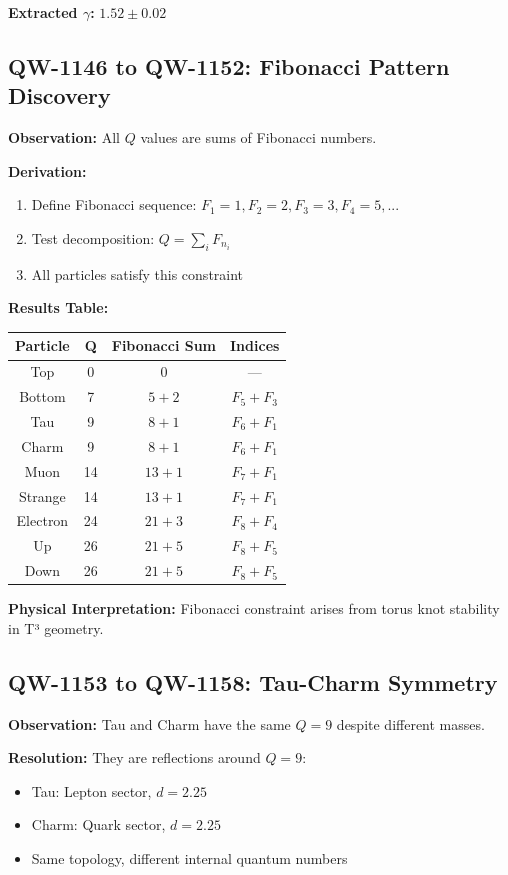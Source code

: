 \documentclass[11pt, a4paper]{article}
\theoremstyle{remark}
\begin{document}
\textbf{Extracted $\gamma$:} $1.52 \pm 0.02$

\subsection{QW-1146 to QW-1152: Fibonacci Pattern Discovery}

\textbf{Observation:} All $Q$ values are sums of Fibonacci numbers.

\textbf{Derivation:}
\begin{enumerate}
    \item Define Fibonacci sequence: $F_1 = 1, F_2 = 2, F_3 = 3, F_4 = 5, ...$
    \item Test decomposition: $Q = \sum_i F_{n_i}$
    \item All particles satisfy this constraint
\end{enumerate}

\textbf{Results Table:}
\begin{center}
\begin{tabular}{|c|c|c|c|}
\hline
\textbf{Particle} & \textbf{Q} & \textbf{Fibonacci Sum} & \textbf{Indices} \\
\hline
Top & 0 & 0 & --- \\
Bottom & 7 & $5 + 2$ & $F_5 + F_3$ \\
Tau & 9 & $8 + 1$ & $F_6 + F_1$ \\
Charm & 9 & $8 + 1$ & $F_6 + F_1$ \\
Muon & 14 & $13 + 1$ & $F_7 + F_1$ \\
Strange & 14 & $13 + 1$ & $F_7 + F_1$ \\
Electron & 24 & $21 + 3$ & $F_8 + F_4$ \\
Up & 26 & $21 + 5$ & $F_8 + F_5$ \\
Down & 26 & $21 + 5$ & $F_8 + F_5$ \\
\hline
\end{tabular}
\end{center}

\textbf{Physical Interpretation:} Fibonacci constraint arises from torus knot stability in T³ geometry.

\subsection{QW-1153 to QW-1158: Tau-Charm Symmetry}

\textbf{Observation:} Tau and Charm have the same $Q = 9$ despite different masses.

\textbf{Resolution:} They are reflections around $Q = 9$:
\begin{itemize}
    \item Tau: Lepton sector, $d = 2.25$
    \item Charm: Quark sector, $d = 2.25$
    \item Same topology, different internal quantum numbers
\end{itemize}
\end{document}
